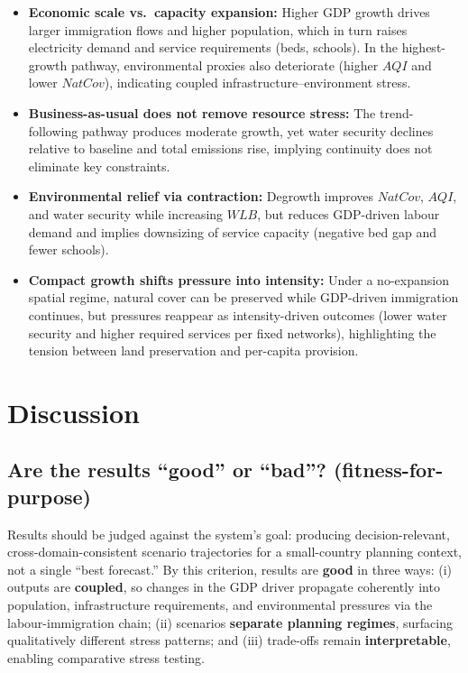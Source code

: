 \documentclass{article}
\begin{document}
\begin{itemize}
    \item \textbf{Economic scale vs.\ capacity expansion:} Higher GDP growth
          drives larger immigration flows and higher population, which in turn
          raises electricity demand and service requirements (beds, schools).
          In the highest-growth pathway, environmental proxies also deteriorate
          (higher $AQI$ and lower $NatCov$), indicating coupled
          infrastructure--environment stress.
    \item \textbf{Business-as-usual does not remove resource stress:} The
          trend-following pathway produces moderate growth, yet water security
          declines relative to baseline and total emissions rise, implying
          continuity does not eliminate key constraints.
    \item \textbf{Environmental relief via contraction:} Degrowth improves
          $NatCov$, $AQI$, and water security while increasing $WLB$, but
          reduces GDP-driven labour demand and implies downsizing of service
          capacity (negative bed gap and fewer schools).
    \item \textbf{Compact growth shifts pressure into intensity:} Under a
          no-expansion spatial regime, natural cover can be preserved while
          GDP-driven immigration continues, but pressures reappear as
          intensity-driven outcomes (lower water security and higher required
          services per fixed networks), highlighting the tension between land
          preservation and per-capita provision.
\end{itemize}

\section{Discussion}
\label{sec:discussion}

\subsection{Are the results ``good'' or ``bad''? (fitness-for-purpose)}

Results should be judged against the system's goal: producing decision-relevant,
cross-domain-consistent scenario trajectories for a small-country planning
context, not a single ``best forecast.'' By this criterion, results are
\textbf{good} in three ways: (i) outputs are \textbf{coupled}, so changes in
the GDP driver propagate coherently into population, infrastructure requirements,
and environmental pressures via the labour-immigration chain; (ii) scenarios
\textbf{separate planning regimes}, surfacing qualitatively different stress
patterns; and (iii) trade-offs remain \textbf{interpretable}, enabling
comparative stress testing.
\end{document}

